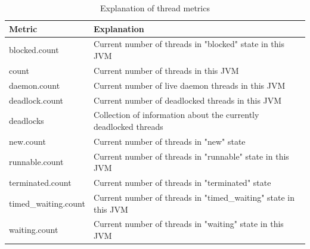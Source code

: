 \documentclass{seal_thesis}
\begin{document}
\begin{table}[ht]
\centering
\begin{tabular}{|l|l|}
\hline
\textbf{Metric} & \textbf{Explanation} \\ \hline
blocked.count & Current number of threads in "blocked" state in this JVM \\ \hline
count & Current number of threads in this JVM\\ \hline
daemon.count & Current number of live daemon threads in this JVM \\ \hline
deadlock.count & Current number of deadlocked threads in this JVM \\ \hline
deadlocks & Collection of information about the currently deadlocked threads \\ \hline
new.count & Current number of threads in "new" state\\ \hline
runnable.count & Current number of threads in "runnable" state in this JVM \\ \hline
terminated.count & Current number of threads in "terminated" state \\ \hline
timed\_waiting.count & Current number of threads in "timed\_waiting" state in this JVM \\ \hline
waiting.count & Current number of threads in "waiting" state in this JVM \\ \hline
\end{tabular}
\caption{Explanation of thread metrics}
\label{tab:thread_metrics}
\end{table}


\end{document}

